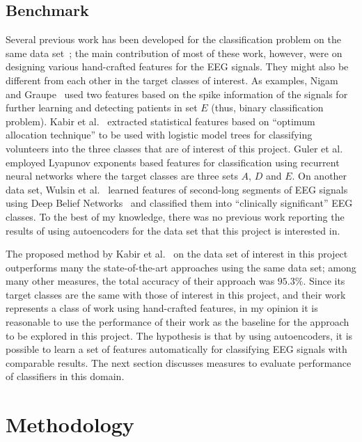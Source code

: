 \documentclass[12pt]{article}
\begin{document}
\subsection{Benchmark}
\noindent
Several previous work has been developed for the classification problem on the same data set~\cite{andrzejak2001indications}; the main contribution of most of these work, however, were on designing various hand-crafted features for the EEG signals. They might also be different from each other in the target classes of interest. As examples, Nigam and Graupe~\cite{nigam2004neural} used two features based on the spike information of the signals for further learning and detecting patients in set $E$ (thus, binary classification problem). Kabir et al.~\cite{kabir2016epileptic} extracted statistical features based on ``optimum allocation technique'' to be used with logistic model trees for classifying volunteers into the three classes that are of interest of this project. Guler et al.~\cite{guler2005recurrent} employed Lyapunov exponents based features for classification using recurrent neural networks where the target classes are three sets $A$, $D$ and $E$. On another data set, Wulsin et al.~\cite{wulsin2011modeling} learned features of second-long segments of EEG signals using Deep Belief Networks~\cite{hinton2006reducing} and classified them into ``clinically significant'' EEG classes. To the best of my knowledge, there was no previous work reporting the results of using autoencoders for the data set that this project is interested in.

The proposed method by Kabir et al.~\cite{kabir2016epileptic} on the data set of interest in this project outperforms many the state-of-the-art approaches using the same data set; among many other measures, the total accuracy of their approach was $95.3\%$. Since its target classes are the same with those of interest in this project, and their work represents a class of work using hand-crafted features, in my opinion it is reasonable to use the performance of their work as the baseline for the approach to be explored in this project. The hypothesis is that by using autoencoders, it is possible to learn a set of features automatically for classifying EEG signals with comparable results. The next section discusses measures to evaluate performance of classifiers in this domain.


\section{Methodology}
\end{document}
